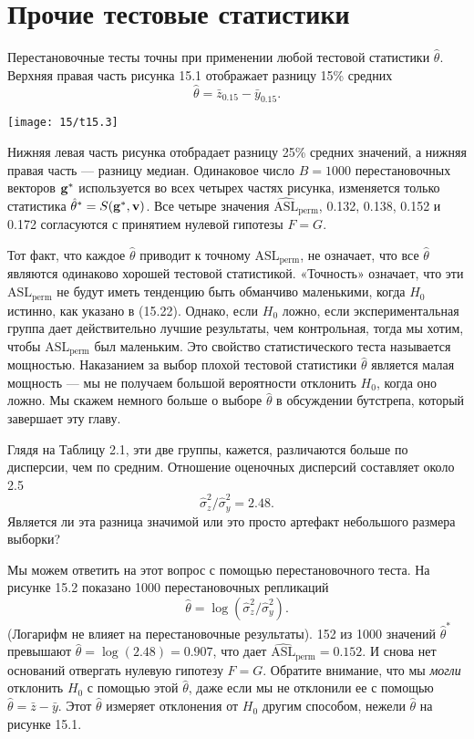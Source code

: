 \section{Прочие тестовые статистики}

Перестановочные тесты точны при применении любой тестовой статистики $\hat{\theta}$. Верхняя правая часть рисунка 15.1 отображает разницу 15\% средних
\begin{equation}
	\hat{\theta} = \bar{z}_{0.15} - \bar{y}_{0.15}.
\end{equation}

\noindent
\noindent\texttt{[image: 15/t15.3]}
\newline

\noindent Нижняя левая часть рисунка отобрадает разницу 25\% средних значений, а нижняя правая часть --- разницу медиан. Одинаковое число $B = 1000$ перестановочных векторов $\bf{g}^*$ используется во всех четырех частях рисунка, изменяется только статистика $\hat{\theta}^* = S(\bf{g}^*, \bf{v})$. Все четыре значения $\widehat{\text{ASL}}_{\text{perm}}$, 0.132, 0.138, 0.152 и 0.172 согласуются с принятием нулевой гипотезы $F = G$.

Тот факт, что каждое $\hat{\theta}$ приводит к точному $\text{ASL}_{\text{perm}}$, не означает, что все $\hat{\theta}$ являются одинаково хорошей тестовой статистикой. «Точность» означает, что эти $\text{ASL}_\text{perm}$ не будут иметь тенденцию быть обманчиво маленькими, когда $H_0$ истинно, как указано в (15.22). Однако, если $H_0$ ложно, если экспериментальная группа дает действительно лучшие результаты, чем контрольная, тогда мы хотим, чтобы $\text{ASL}_\text{perm}$ был маленьким. Это свойство статистического теста называется мощностью. Наказанием за выбор плохой тестовой статистики $\hat{\theta}$ является малая мощность --- мы не получаем большой вероятности отклонить $H_0$, когда оно ложно. Мы скажем немного больше о выборе $\hat{\theta}$ в обсуждении бутстрепа, который завершает эту главу.

Глядя на Таблицу 2.1, эти две группы, кажется, различаются больше по дисперсии, чем по средним. Отношение оценочных дисперсий составляет около 2.5
\begin{equation}
	\hat{\sigma}^2_z / \hat{\sigma}^2_y = 2.48.
\end{equation}
Является ли эта разница значимой или это просто артефакт небольшого размера выборки?

Мы можем ответить на этот вопрос с помощью перестановочного теста. На рисунке 15.2 показано 1000 перестановочных репликаций
\begin{equation}
	\hat{\theta} = \log (\hat{\sigma}^2_z/\hat{\sigma}^2_y).
\end{equation}
(Логарифм не влияет на перестановочные результаты). 152 из 1000 значений $\hat{\theta}^*$ превышают $\hat{\theta} = \log(2.48) = 0.907$, что дает $\widehat{\text{ASL}}_{\text{perm}} = 0.152$. И снова нет оснований отвергать нулевую гипотезу $F = G$. Обратите внимание, что мы \textit{могли} отклонить $H_0$ с помощью этой $\hat{\theta}$, даже если мы не отклонили ее с помощью $\hat{\theta} = \bar{z} - \bar{y}$. Этот $\hat{\theta}$ измеряет отклонения от $H_0$ другим способом, нежели $\hat{\theta}$ на рисунке 15.1.

